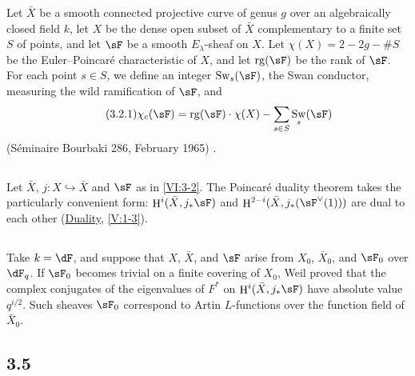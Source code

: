 \documentclass[oneside]{book}
\DeclareMathOperator{\h}{H}
\DeclareMathOperator{\swan}{Sw}
\newcounter{char}
\theoremstyle{sga-source}
\theoremstyle{sga-source-dash}
\theoremstyle{sga-source-dotdash}
\theoremstyle{sga-source-number-note-dash}
\theoremstyle{sga-source-note-number-dotdash}
\theoremstyle{sga-source-example-dotdash}
\theoremstyle{sga-source-inline-number}
\theoremstyle{sga-source-bare-number}
\theoremstyle{sga-source}
\newcommand{\PrintPage}[1]{}\newcommand{\MathPage}[1]{}\newcommand{\PrintCite}[2]{#1}\newcommand{\var}[3]{#2}
\begin{document}
Let $\bar X$ be a smooth connected projective curve of genus $g$ over an 
algebraically closed field $k$, let $X$ be the dense open subset of $\bar X$ 
complementary to a finite set $S$ of points, and let $\sF$ be a 
smooth $E_\lambda$-sheaf on $X$. Let $\chi(X)=2-2 g-\# S$ be the 
Euler--Poincaré characteristic of $X$, and let $\operatorname{rg}(\sF)$ be the 
rank of $\sF$. For each point $s\in S$, we define an integer 
$\swan_s(\sF)$, the Swan conductor, measuring the wild ramification of 
$\sF$, and 
\begin{align*}\tag{3.2.1}\label{VI:eq:3-2-1}
  \chi_c(\sF) = \operatorname{rg}(\sF) \cdot \chi(X) - \sum_{s\in S} \swan_s(\sF) 
\end{align*}
(Séminaire Bourbaki 286, February 1965) \cite{ra65}. 





\subsection{}\label{VI:3-3}

Let $\bar X$, $j:X\hookrightarrow\bar X$ and $\sF$ as in \ref{VI:3-2}. The 
Poincaré duality theorem takes the particularly convenient form: 
$\h^i(\bar X,j_\ast \sF)$ and $\var{\h^{2-i}(\bar X,j_\ast(\sF^\vee(1))}{\h^{2-i}(\bar X,j_\ast(\sF^\vee(1)))}{S45-SOL-0757}$ are 
dual to each other (\hyperref[V]{Duality}, \ref{V:1-3}). 





\PrintPage{190}
\subsection{}\label{VI:3-4}

Take $k=\dF$, and suppose that $X$, $\bar X$, and $\sF$ arise from 
$X_0$, $\bar X_0$, and $\sF_0$ over $\dF_q$. If $\sF_0$ becomes trivial on a 
finite covering of $X_0$, Weil proved that the complex conjugates of 
the eigenvalues of $F^\ast$ on $\h^i(\bar X,j_\ast\sF)$ have absolute value 
$q^{i/2}$. Such sheaves $\sF_0$ correspond to Artin $L$-functions 
over the function field of $\bar X_0$. 





\subsection*{3.5}\label{VI:3-5_} %
\end{document}
